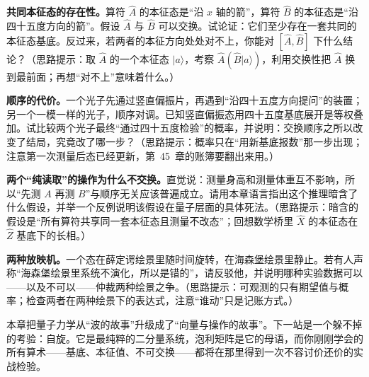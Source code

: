 \begin{puzzles}
\item \textbf{共同本征态的存在性。}算符 $\hat{A}$ 的本征态是“沿 $x$ 轴的箭”，算符 $\hat{B}$ 的本征态是“沿四十五度方向的箭”。假设 $\hat{A}$ 与 $\hat{B}$ 可以交换。试论证：它们至少存在一套共同的本征态基底。反过来，若两者的本征方向处处对不上，你能对 $[\hat{A},\hat{B}]$ 下什么结论？（思路提示：取 $\hat{A}$ 的一个本征态 $|a\rangle$，考察 $\hat{A}(\hat{B}|a\rangle)$，利用交换性把 $\hat{A}$ 换到最前面；再想“对不上”意味着什么。）
\item \textbf{顺序的代价。}一个光子先通过竖直偏振片，再遇到“沿四十五度方向提问”的装置；另一个一模一样的光子，顺序对调。已知竖直偏振态用四十五度基底展开是等权叠加。试比较两个光子最终“通过四十五度检验”的概率，并说明：交换顺序之所以改变了结局，究竟改了哪一步？（思路提示：概率只在“用新基底报数”那一步出现；注意第一次测量后态已经更新，第~45~章的账簿要翻出来用。）
\item \textbf{两个“纯读取”的操作为什么不交换。}直觉说：测量身高和测量体重互不影响，所以“先测 $A$ 再测 $B$”与顺序无关应该普遍成立。请用本章语言指出这个推理暗含了什么假设，并举一个反例说明该假设在量子层面的具体死法。（思路提示：暗含的假设是“所有算符共享同一套本征态且测量不改态”；回想数学桥里 $\hat{X}$ 的本征态在 $\hat{Z}$ 基底下的长相。）
\item \textbf{两种放映机。}一个态在薛定谔绘景里随时间旋转，在海森堡绘景里静止。若有人声称“海森堡绘景里系统不演化，所以是错的”，请反驳他，并说明哪种实验数据可以——以及不可以——仲裁两种绘景之争。（思路提示：可观测的只有期望值与概率；检查两者在两种绘景下的表达式，注意“谁动”只是记账方式。）
\end{puzzles}

本章把量子力学从“波的故事”升级成了“向量与操作的故事”。下一站是一个躲不掉的考验：自旋。它是最纯粹的二分量系统，泡利矩阵是它的母语，而你刚刚学会的所有算术——基底、本征值、不可交换——都将在那里得到一次不容讨价还价的实战检验。
